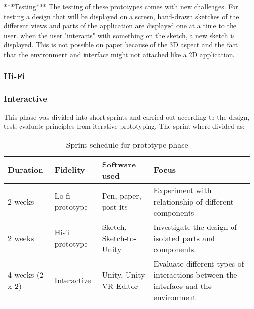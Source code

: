 ***Testing*** The testing of these prototypes comes with new challenges. For testing a design that will be displayed on a screen, hand-drawn sketches of the different views and parts of the application are displayed one at a time to the user. when the user "interacts" with something on the sketch, a new sketch is displayed. This is not possible on paper because of the 3D aspect and the fact that the environment and interface might not attached like a 2D application.
\subsubsection{Hi-Fi}
\label{method:prototype:hifi}
\subsubsection{Interactive}


This phase was divided into short sprints and carried out according to the design, test, evaluate principles from iterative prototyping.\cite{proto:hartson2012ux} The sprint where divided as:

\begin{table}[]
  \centering
  \caption{Sprint schedule for prototype phase}
  \label{table:sprints}
  \begin{tabular}{|l|l|l| p{5cm}|}
     \hline
    \textbf{Duration} & \textbf{Fidelity} & \textbf{Software used} & \textbf{Focus} \\\hline
    2 weeks                         & Lo-fi prototype  & Pen, paper, post-its    & Experiment with relationship of different components                               \\\hline
    2 weeks                        & Hi-fi prototype & Sketch, Sketch-to-Unity & Investigate the design of isolated parts and components.                           \\\hline
    4 weeks (2 x 2)                 & Interactive   & Unity, Unity VR Editor  & Evaluate different types of interactions between the interface and the environment  \\\hline
  \end{tabular}
\end{table}
